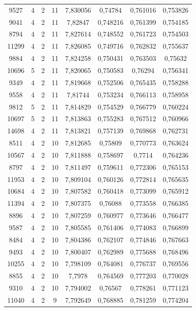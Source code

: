 \begin{longtable}{|c|c|c|c|c|c|c|c|}
9527 & 4 & 2 & 11 & 7,830056 & 0,74784 & 0,761016 & 0,753826 \\
9041 & 4 & 2 & 11 & 7,82847 & 0,748216 & 0,761399 & 0,754185 \\
8794 & 4 & 2 & 11 & 7,827614 & 0,748552 & 0,761723 & 0,754503 \\
11299 & 4 & 2 & 11 & 7,826085 & 0,749716 & 0,762832 & 0,755637 \\
9884 & 4 & 2 & 11 & 7,824258 & 0,750431 & 0,763503 & 0,75632 \\
10696 & 5 & 2 & 11 & 7,820065 & 0,750583 & 0,76294 & 0,756341 \\
9349 & 4 & 2 & 11 & 7,819668 & 0,752506 & 0,765435 & 0,758288 \\
9558 & 4 & 2 & 11 & 7,81744 & 0,753234 & 0,766113 & 0,758958 \\
9812 & 5 & 2 & 11 & 7,814829 & 0,754529 & 0,766779 & 0,760224 \\
10697 & 5 & 2 & 11 & 7,813863 & 0,755283 & 0,767512 & 0,760966 \\
14698 & 4 & 2 & 11 & 7,813821 & 0,757139 & 0,769868 & 0,762731 \\
8511 & 4 & 2 & 10 & 7,812685 & 0,75809 & 0,770773 & 0,763624 \\
10567 & 4 & 2 & 10 & 7,811888 & 0,758697 & 0,7714 & 0,764236 \\
8797 & 4 & 2 & 10 & 7,811497 & 0,759611 & 0,772306 & 0,765153 \\
11953 & 4 & 2 & 10 & 7,809104 & 0,760126 & 0,772814 & 0,765635 \\
10684 & 4 & 2 & 10 & 7,807582 & 0,760418 & 0,773099 & 0,765912 \\
11394 & 4 & 2 & 10 & 7,807375 & 0,76088 & 0,773558 & 0,766385 \\
8896 & 4 & 2 & 10 & 7,807259 & 0,760977 & 0,773646 & 0,766477 \\
9587 & 4 & 2 & 10 & 7,805585 & 0,761406 & 0,774083 & 0,766899 \\
8484 & 4 & 2 & 10 & 7,804386 & 0,762107 & 0,774846 & 0,767663 \\
9493 & 4 & 2 & 10 & 7,800407 & 0,762989 & 0,775688 & 0,768496 \\
10255 & 4 & 2 & 10 & 7,798109 & 0,764081 & 0,776737 & 0,769556 \\
8855 & 4 & 2 & 10 & 7,7978 & 0,764569 & 0,777203 & 0,770028 \\
9310 & 4 & 2 & 10 & 7,794002 & 0,76567 & 0,778261 & 0,771123 \\
11040 & 4 & 2 & 9 & 7,792649 & 0,768885 & 0,781259 & 0,774204 \\

\end{longtable}
